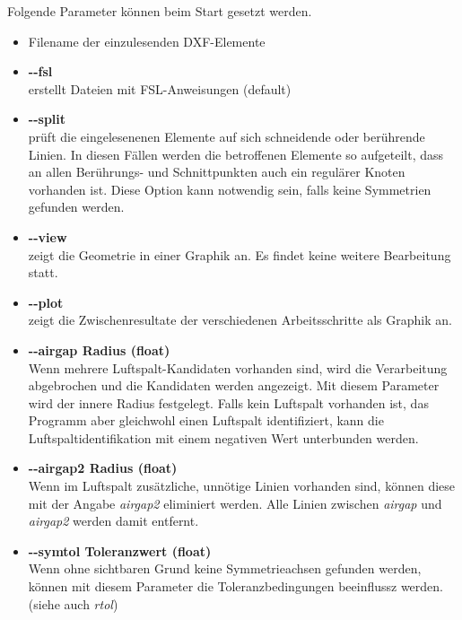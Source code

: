 \documentclass[10pt, a4paper,german]{scrartcl}
\newcommand{\Slanted}[1]{{\normalfont\slshape #1}}
\newcommand{\LongArg}[1]{\mbox{{-}{-}#1}}
\begin{document}
Folgende Parameter können beim Start gesetzt werden.
\begin{itemize}
\item Filename der einzulesenden DXF-Elemente
\item {\bfseries{\LongArg{fsl}}}\\
      erstellt Dateien mit FSL-Anweisungen (default)
                
\item {\bfseries{\LongArg{split}}}\\
		prüft die eingelesenenen Elemente auf sich schneidende oder berührende Linien.
		In diesen Fällen werden die betroffenen Elemente so aufgeteilt,
		dass an allen Berührungs- und Schnittpunkten auch ein regulärer Knoten vorhanden ist. 
       Diese Option kann notwendig sein, falls keine Symmetrien gefunden werden.
		
\item {\bfseries{\LongArg{view}}}\\
		zeigt die Geometrie in einer Graphik an. Es findet keine weitere Bearbeitung statt.
		
\item {\bfseries{\LongArg{plot}}}\\
		zeigt die Zwischenresultate der verschiedenen Arbeitsschritte als Graphik an.
		
\item {\bfseries{\LongArg{airgap} Radius (float)}}\\
		Wenn mehrere Luftspalt-Kandidaten vorhanden sind, wird die Verarbeitung abgebrochen und
		die Kandidaten werden angezeigt. Mit diesem Parameter wird der innere Radius festgelegt.
		Falls kein Luftspalt vorhanden ist, das Programm aber gleichwohl einen Luftspalt
		identifiziert, kann die Luftspaltidentifikation mit einem negativen Wert unterbunden werden.

\item {\bfseries{\LongArg{airgap2} Radius (float)}}\\
		Wenn im Luftspalt zusätzliche, unnötige Linien vorhanden sind, können diese mit der
		Angabe \Slanted{airgap2} eliminiert werden. Alle Linien zwischen \Slanted{airgap} und
		\Slanted{airgap2} werden damit entfernt.
		
\item {\bfseries{\LongArg{symtol} Toleranzwert (float)}}\\
		Wenn ohne sichtbaren Grund keine Symmetrieachsen gefunden werden, können mit diesem Parameter
		die Toleranzbedingungen beeinflussz werden.
		(siehe auch \Slanted{rtol})
		

\end{itemize}
\end{document}
